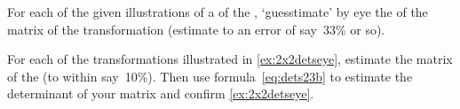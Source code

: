 \begin{exercise} \label{ex:2x2detseye} 
For each of the given illustrations of a  of the , `guesstimate' by eye the  of the matrix of the transformation (estimate to an error of say~33\% or so).
\begin{Parts}
\item {}

\item {}

\item {}

\item {}

\item {}

\item {}

\begin{reduce}
\item {}

\item {}

\item {}

\item {}

\item {}

\item {}
\end{reduce}
\end{Parts}
\end{exercise}




\begin{exercise}  
For each of the transformations illustrated in \cref{ex:2x2detseye}, estimate the matrix of the  (to within say~10\%). 
Then use formula~\eqref{eq:dets23b} to estimate the determinant of your matrix and confirm \cref{ex:2x2detseye}.
\end{exercise}





